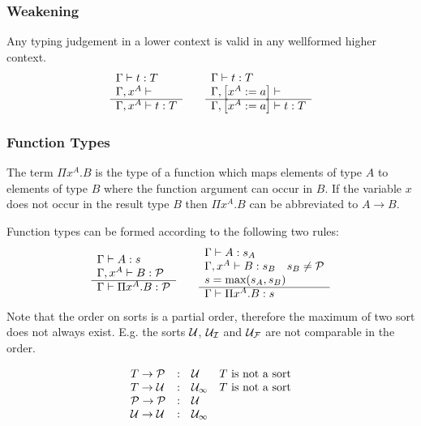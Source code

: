 \subsubsection{Weakening}

Any typing judgement in a lower context is valid in any wellformed higher
context.
$$
\begin{array}{l} 
    \Gamma \vdash t : T
    \\
    \Gamma, x^A \vdash
 \\ \hline 
    \Gamma, x^A \vdash t : T
 \end{array}
\quad\quad
\begin{array}{l} 
    \Gamma \vdash t : T
    \\
    \Gamma, \left[ {x^A := a} \right] \vdash
 \\ \hline 
    \Gamma, \left[ {x^A := a} \right] \vdash t : T
 \end{array}
$$





\subsubsection{Function Types}

The term $\Pi x^A.B$ is the type of a function which maps elements of type $A$
to elements of type $B$ where the function argument can occur in $B$. If the
variable $x$ does not occur in the result type $B$ then $\Pi x^A.B$ can be
abbreviated to $A \to B$.

Function types can be formed according to the following two rules:
%
$$
\begin{array}{l} 
    \Gamma \vdash A: s
    \\
    \Gamma, x^A \vdash B: {\mathcal P}
 \\ \hline 
    \Gamma \vdash \Pi x^A. B : {\mathcal P}
 \end{array}
\quad\quad
\begin{array}{l} 
    \Gamma \vdash A: s_A
    \\
    \Gamma, x^A \vdash B: s_B \quad s_B \ne {\mathcal P}
    \\
    s = \text{max}(s_A, s_B)
 \\ \hline 
    \Gamma \vdash \Pi x^A. B : s
 \end{array}
$$
%
Note that the order on sorts is a partial order, therefore the maximum of two
sort does not always exist. E.g. the sorts ${\mathcal U}$, ${{\mathcal U}_\mathcal I}$ and ${{\mathcal U}_\mathcal F}$ are
not comparable in the order.

$$
\begin{array}{lllll} 
    T \to {\mathcal P}     &:&     {\mathcal U}    & T \text{ is not a sort}
    \\
    T \to {\mathcal U}      &:&     {{\mathcal U}_\infty}    & T \text{ is not a sort}
    \\
    {\mathcal P} \to {\mathcal P} &:&     {\mathcal U}
    \\
    {\mathcal U} \to {\mathcal U}   &:&     {{\mathcal U}_\infty}
 \end{array}
$$







